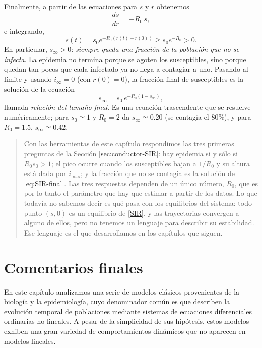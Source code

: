 \documentclass[12pt, a4paper]{amsbook}
\theoremstyle{remark}
\theoremstyle{definition}
\numberwithin{section}{chapter}
\numberwithin{subsection}{section}
\numberwithin{equation}{section}
\numberwithin{figure}{chapter}
\newenvironment{volvemos}[1]{\medskip\par\noindent\begin{quote}\noindent{\bf Volvemos al problema: #1.}\par\smallskip}{\end{quote}\medskip}
\begin{document}
Finalmente, a partir de las ecuaciones para $s$ y $r$ obtenemos
\[
\frac{ds}{dr} = -R_0\, s,
\]
e integrando,
\[
s(t) = s_0 e^{-R_0 (r(t)-r(0))} \ge s_0 e^{-R_0} > 0.
\]
En particular, $s_\infty>0$: \emph{siempre queda una fracción de la población que no se infecta}. La epidemia no termina porque se agoten los susceptibles, sino porque quedan tan pocos que cada infectado ya no llega a contagiar a uno. Pasando al límite y usando $i_\infty=0$ (con $r(0)=0$), la fracción final de susceptibles es la solución de la ecuación
\begin{equation}\label{eq:SIR-final}
s_\infty = s_0\, e^{-R_0(1-s_\infty)},
\end{equation}
llamada \emph{relación del tamaño final}. Es una ecuación trascendente que se resuelve numéricamente; para $s_0\simeq 1$ y $R_0=2$ da $s_\infty\simeq 0.20$ (se contagia el $80\%$), y para $R_0=1.5$, $s_\infty\simeq 0.42$.

\begin{volvemos}{la epidemia}
Con las herramientas de este capítulo respondimos las tres primeras preguntas de la Sección \ref{sec:conductor-SIR}: hay epidemia si y sólo si $R_0 s_0>1$; el pico ocurre cuando los susceptibles bajan a $1/R_0$ y su altura está dada por $i_{\max}$; y la fracción que no se contagia es la solución de \eqref{eq:SIR-final}. Las tres respuestas dependen de un único número, $R_0$, que es por lo tanto el parámetro que hay que estimar a partir de los datos. Lo que todavía no sabemos decir es qué pasa con los equilibrios del sistema: todo punto $(s,0)$ es un equilibrio de \eqref{SIR}, y las trayectorias convergen a alguno de ellos, pero no tenemos un lenguaje para describir su estabilidad. Ese lenguaje es el que desarrollamos en los capítulos que siguen.
\end{volvemos}

\section{Comentarios finales}

En este capítulo analizamos una serie de modelos clásicos provenientes de la biología y la epidemiología, cuyo denominador común es que describen la evolución temporal de poblaciones mediante sistemas de ecuaciones diferenciales ordinarias no lineales. A pesar de la simplicidad de sus hipótesis, estos modelos exhiben una gran variedad de comportamientos dinámicos que no aparecen en modelos lineales.
\end{document}
